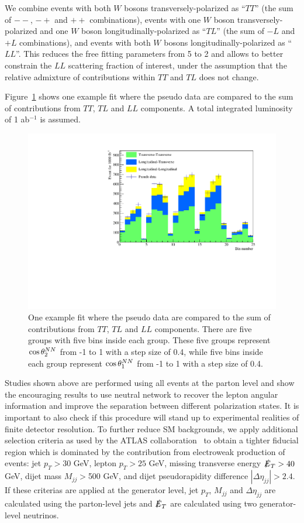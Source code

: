 We combine events with both $W$ bosons transversely-polarized as
``$TT$'' (the sum of $--$, $-+$ and $++$ combinations), events with
one $W$ boson transversely-polarized and one $W$ boson
longitudinally-polarized as ``$TL$'' (the sum of $-L$ and $+L$
combinations), and events with both $W$ bosons
longitudinally-polarized as ``$LL$''. This reduces the free fitting parameters from 5 to 2 and 
allows to better constrain the $LL$ scattering fraction of interest, under the assumption that
the relative admixture of contributions within $TT$ and $TL$ does not change. 

Figure~\ref{fig:fit_example} shows one example fit where the pseudo data are compared to the sum of 
contributions from $TT$, $TL$ and $LL$ components. A total integrated luminosity of 1 ab$^{-1}$ is assumed.  

\begin{figure}[h]
\includegraphics[width=.49\textwidth]{./fig/NN_fit_3.pdf}
\caption{\label{fig:fit_example} One example fit where the pseudo data are compared to the sum of 
contributions from $TT$, $TL$ and $LL$ components. There are five groups with five bins inside each group. 
These five groups represent $ \cos \theta^{NN}  _2$ from -1 to 1 with a step size of 0.4, while five bins inside each group represent $ \cos \theta^{NN}  _1$ from -1 to 1 with a step size of 0.4.}
\end{figure}

Studies shown above are performed using all events at the parton level  
and show the encouraging results to use neutral network to recover the lepton angular information and improve the separation between different polarization states. 
It is important to also check if this procedure will stand up to experimental realities of finite detector resolution. 
To further reduce SM backgrounds, we apply additional selection criteria as used by the ATLAS collaboration~\cite{ATLAS_ssWW} to obtain a
tighter fiducial region which is dominated by the contribution from electroweak production of \ssWW events: jet $p_T > 30$ GeV, lepton $p_T > 25$ GeV, missing transverse energy $\slashed{E}_T > 40$ GeV, 
dijet mass $M_{jj} > $500 GeV, and dijet pseudorapidity difference $|\Delta \eta_{jj}| > 2.4 $. 
If these criterias are applied at the generator level, jet $p_T$, $M_{jj}$ and $\Delta \eta_{jj}$ are calculated using the parton-level jets 
and $\slashed{E}_T$ are calculated using two generator-level neutrinos.

